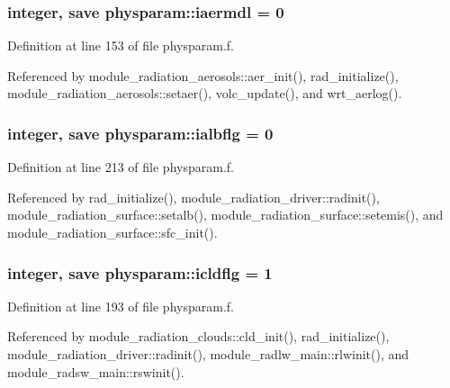 \subsubsection[{\texorpdfstring{iaermdl}{iaermdl}}]{\setlength{\rightskip}{0pt plus 5cm}integer, save physparam\+::iaermdl = 0}\hypertarget{namespacephysparam_a6fe54722a9d657514d7e4df8f49395fc}{}\label{namespacephysparam_a6fe54722a9d657514d7e4df8f49395fc}


Definition at line 153 of file physparam.\+f.



Referenced by module\+\_\+radiation\+\_\+aerosols\+::aer\+\_\+init(), rad\+\_\+initialize(), module\+\_\+radiation\+\_\+aerosols\+::setaer(), volc\+\_\+update(), and wrt\+\_\+aerlog().

\subsubsection[{\texorpdfstring{ialbflg}{ialbflg}}]{\setlength{\rightskip}{0pt plus 5cm}integer, save physparam\+::ialbflg = 0}\hypertarget{namespacephysparam_aeaf899d0cbd4248ad4b7f855cb4626e1}{}\label{namespacephysparam_aeaf899d0cbd4248ad4b7f855cb4626e1}


Definition at line 213 of file physparam.\+f.



Referenced by rad\+\_\+initialize(), module\+\_\+radiation\+\_\+driver\+::radinit(), module\+\_\+radiation\+\_\+surface\+::setalb(), module\+\_\+radiation\+\_\+surface\+::setemis(), and module\+\_\+radiation\+\_\+surface\+::sfc\+\_\+init().

\subsubsection[{\texorpdfstring{icldflg}{icldflg}}]{\setlength{\rightskip}{0pt plus 5cm}integer, save physparam\+::icldflg = 1}\hypertarget{namespacephysparam_aaba5cffa32ce34374f15cb09e21ab973}{}\label{namespacephysparam_aaba5cffa32ce34374f15cb09e21ab973}


Definition at line 193 of file physparam.\+f.



Referenced by module\+\_\+radiation\+\_\+clouds\+::cld\+\_\+init(), rad\+\_\+initialize(), module\+\_\+radiation\+\_\+driver\+::radinit(), module\+\_\+radlw\+\_\+main\+::rlwinit(), and module\+\_\+radsw\+\_\+main\+::rswinit().

